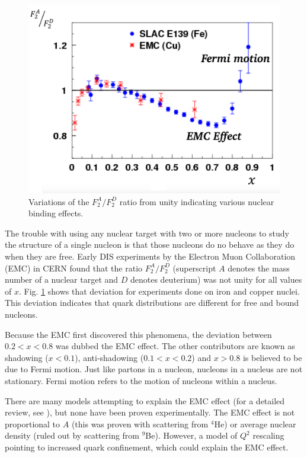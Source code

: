 \begin{figure}[h!]
	\centering
	\includegraphics[width=0.9\linewidth]{figures/EMC.png}
	\caption{Variations of the $F_2^A/F_2^D$ ratio from unity indicating various nuclear binding effects. \cite{emc1}\cite{emc2}}
	\label{fig:emc}
\end{figure}

The trouble with using any nuclear target with two or more nucleons to study the structure of a single nucleon is that those nucleons do no behave as they do when they are free. Early DIS experiments by the Electron Muon Collaboration (EMC) in CERN found that the ratio $F_2^A/F_2^D$ (superscript $A$ denotes the mass number of a nuclear target and $D$ denotes deuterium) was not unity for all values of $x$. Fig. \ref{fig:emc} shows that deviation for experiments done on iron and copper nuclei. This deviation indicates that quark distributions are different for free and bound nucleons.

Because the EMC first discovered this phenomena, the deviation between $0.2<x<0.8$ was dubbed the EMC effect. The other contributors are known as shadowing ($x<0.1$), anti-shadowing ($0.1<x<0.2$) and $x>0.8$ is believed to be due to Fermi motion. Just like partons in a nucleon, nucleons in a nucleus are not stationary. Fermi motion refers to the motion of nucleons within a nucleus.

There are many models attempting to explain the EMC effect (for a detailed review, see \cite{emc_rev}), but none have been proven experimentally. The EMC effect is not proportional to $A$ (this was proven with scattering from $^4$He) or average nuclear density (ruled out by scattering from $^9$Be). However, a model of $Q^2$ rescaling pointing to increased quark confinement, which could explain the EMC effect\cite{emc_rev}.

